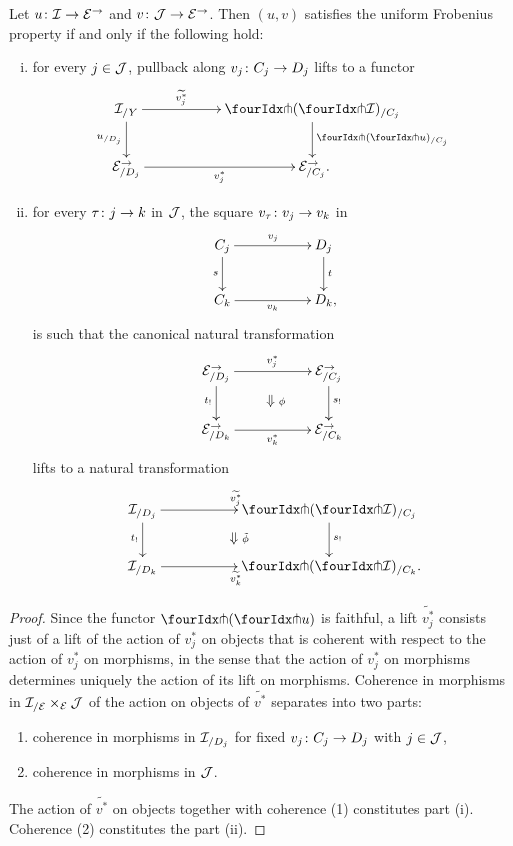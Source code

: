 \documentclass[reqno,10pt,a4paper,oneside,draft]{amsart}
\begin{document}
{{\begin{proposition}  \label{def:uniFrobcond}
 Let $u \co \cal{I} \to \catE^\to$ and $v \co \cal{J} \to \catE^\to$. Then $(u,v)$ satisfies the
uniform Frobenius property  if and only if the following hold:
\begin{enumerate}[(i)]
\item for every  $j \in \cal{J}$, pullback along $v_j \co C_j \to D_j$ lifts to a functor
\[
\xymatrix@C+3em{
  \cal{I}_{/Y}
  \ar[r]^-{\widetilde{v_j^*}}
  \ar[d]_-{u_{/D_j}}
&
  \liftl{(\liftr{\cal{I}})}_{/C_j}
  \ar[d]^-{\liftl{(\liftr{u})}_{/C_j}}
\\
  \catE_{/D_j}^\to \ar[r]_-{v_j^*}
&
  \catE_{/C_j}^\to
\rlap{.}}
\]
\item for every $\tau \co j \to k$ in $\cal{J}$, the square $v_\tau \co v_j \to v_k$ in 
\begin{equation} 
\label{def:beck-chevalley:0}
\begin{gathered}
\xymatrix@C+3em{
  C_j
  \ar[r]^{v_j}
  \ar[d]_{s}
&
  D_j
  \ar[d]^{t}
\\
  C_{k}
  \ar[r]_-{v_{k}}
&
  D_{k}
\rlap{,}}
\end{gathered}
\end{equation}
is such that the canonical natural transformation
\[
\xymatrix@C+3em{
  \catE^\to_{/D_j}
  \ar[d]_{t_!}
  \ar[r]^{v_j^*}
  \ar@{}[dr]|{\textstyle\Downarrow \rlap{$\labelstyle\phi$}}
&
  \catE^\to_{/C_j}
  \ar[d]^{s_!}
\\
  \catE^\to_{/D_k}
  \ar[r]_{v_k^*}
&
  \catE^\to_{/C_k}
}
\]
lifts to a natural transformation
\[
\xymatrix@C+3em{
  \cal{I}_{/D_j}
  \ar[r]^{\widetilde{v_j^*}}
  \ar[d]_{t_!}
  \ar@{}[dr]|{\textstyle\Downarrow \rlap{$\labelstyle\tilde{\phi}$}}
&
  \liftl{(\liftr{\cal{I}})}_{/C_j}
  \ar[d]^{s_!}
\\
  \cal{I}_{/D_k}
  \ar[r]_{\widetilde{v_k^*}}
&
  \liftl{(\liftr{\cal{I}})}_{/C_k}
\rlap{.}}
\]
\end{enumerate}
\end{proposition}

\begin{proof}
Since the functor $\liftl{(\liftr{u})}$ is faithful, a lift $\widetilde{v_j^*}$ consists just of a lift of the action of $v_j^*$ on objects that is coherent with respect to the action of $v_j^*$ on morphisms, in the sense that the action of $v_j^*$ on morphisms determines uniquely the action of its
lift on morphisms.
Coherence in morphisms in $\cal{I}_{/\cal{E}} \times_{\cal{E}} \cal{J}$ of the action on objects of $\tilde{v^*}$ separates into two parts:
\begin{enumerate}[(1)] 
\item coherence in morphisms in $\cal{I}_{/D_j}$ for fixed $v_j \co C_j \to D_j$ with $j \in \cal{J}$,
\item coherence in morphisms in $\cal{J}$.
\end{enumerate}
The action of $\tilde{v^*}$ on objects together with coherence (1) constitutes part (i). Coherence (2) constitutes the  part (ii).
\end{proof}


}}
\end{document}
